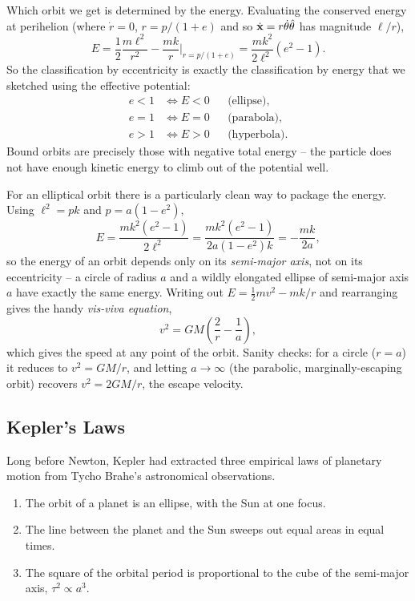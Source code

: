 \documentclass[a4paper]{scrartcl}
\newcommand{\hh}[1]{\hat{\vv{#1}}}
\begin{document}
Which orbit we get is determined by the energy. Evaluating the conserved energy at perihelion (where $\dot{r} = 0$, $r = p/(1 + e)$ and so $\dot{\vv x} = r\dot\theta \hh\theta$ has magnitude $\ell/r$),
$$
E = \frac{1}{2}\frac{m \ell^2}{r^2} - \frac{mk}{r}\bigg|_{r = p/(1+e)} = \frac{mk^2}{2\ell^2}\left(e^2 - 1\right).
$$
So the classification by eccentricity is exactly the classification by energy that we sketched using the effective potential:
\begin{align*}
	e < 1 &\iff E < 0 && \text{(ellipse)}, \\
	e = 1 &\iff E = 0 && \text{(parabola)}, \\
	e > 1 &\iff E > 0 && \text{(hyperbola)}.
\end{align*}
Bound orbits are precisely those with negative total energy -- the particle does not have enough kinetic energy to climb out of the potential well.

For an elliptical orbit there is a particularly clean way to package the energy. Using $\ell^2 = pk$ and $p = a(1 - e^2)$,
$$
E = \frac{mk^2(e^2 - 1)}{2\ell^2} = \frac{mk^2 (e^2 - 1)}{2 a (1 - e^2)k} = -\frac{mk}{2a},
$$
so the energy of an orbit depends only on its \emph{semi-major axis}, not on its eccentricity -- a circle of radius $a$ and a wildly elongated ellipse of semi-major axis $a$ have exactly the same energy. Writing out $E = \frac{1}{2}mv^2 - mk/r$ and rearranging gives the handy \emph{vis-viva equation},
$$
v^2 = GM\left(\frac{2}{r} - \frac{1}{a}\right),
$$
which gives the speed at any point of the orbit. Sanity checks: for a circle ($r = a$) it reduces to $v^2 = GM/r$, and letting $a \to \infty$ (the parabolic, marginally-escaping orbit) recovers $v^2 = 2GM/r$, the escape velocity.

\subsection{Kepler's Laws}

Long before Newton, Kepler had extracted three empirical laws of planetary motion from Tycho Brahe's astronomical observations.

\begin{law}
	\begin{enumerate}
		\item The orbit of a planet is an ellipse, with the Sun at one focus.
		\item The line between the planet and the Sun sweeps out equal areas in equal times.
		\item The square of the orbital period is proportional to the cube of the semi-major axis, $\tau^2 \propto a^3$.
	\end{enumerate}
\end{law}
\end{document}

